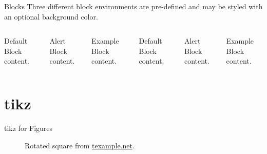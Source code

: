 \begin{frame}{Blocks}
  Three different block environments are pre-defined and may be styled with an
  optional background color.

  \begin{columns}[T,onlytextwidth]
      \begin{block}{Default}
        Block content.
      \end{block}

      \begin{alertblock}{Alert}
        Block content.
      \end{alertblock}

      \begin{exampleblock}{Example}
        Block content.
      \end{exampleblock}



      \begin{block}{Default}
        Block content.
      \end{block}

      \begin{alertblock}{Alert}
        Block content.
      \end{alertblock}

      \begin{exampleblock}{Example}
        Block content.
      \end{exampleblock}

  \end{columns}
\end{frame}

\section{tikz}


\begin{frame}{tikz for Figures}
  \begin{figure}
    \setcounter{density}{20}
    \caption{Rotated square from
    \href{http://www.texample.net/tikz/examples/rotated-polygons/}{texample.net}.}
  \end{figure}
\end{frame}

